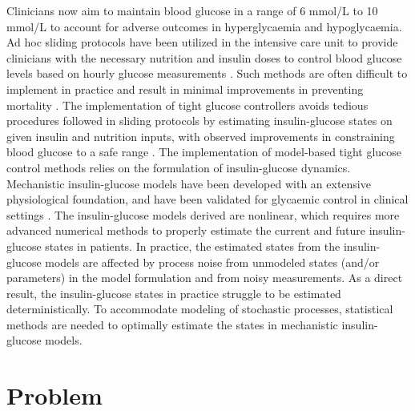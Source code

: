 \documentclass[nomenclature, english, bibtex]{kththesis}
\begin{document}
Clinicians now aim to maintain blood glucose in a range of 6 mmol/L to 10 mmol/L to account for adverse outcomes in hyperglycaemia and hypoglycaemia. Ad hoc sliding protocols have been utilized in the intensive care unit to provide clinicians with the necessary nutrition and insulin doses to control blood glucose levels based on hourly glucose measurements \cite{thomas_implementation_2005} \cite{shaw_rethinking_2006}. Such methods are often difficult to implement in practice and result in minimal improvements in preventing mortality \cite{chase_model-based_nodate}. The implementation of tight glucose controllers avoids tedious procedures followed in sliding protocols by estimating insulin-glucose states on given insulin and nutrition inputs, with observed improvements in constraining blood glucose to a safe range \cite{compte_blood_2009}. The implementation of model-based tight glucose control methods relies on the formulation of insulin-glucose dynamics. Mechanistic insulin-glucose models have been developed with an extensive physiological foundation, and have been validated for glycaemic control in clinical settings \cite{chase_model-based_nodate} \cite{compte_blood_2009} \cite{lotz_monte_2008} \cite{lin_physiological_2011} \cite{hann_integral-based_2005}. The insulin-glucose models derived are nonlinear, which requires more advanced numerical methods to properly estimate the current and future insulin-glucose states in patients. In practice, the estimated states from the insulin-glucose models are affected by process noise from unmodeled states (and/or parameters) in the model formulation and from noisy measurements. As a direct result, the insulin-glucose states in practice struggle to be estimated deterministically. To accommodate modeling of stochastic processes, statistical methods are needed to optimally estimate the states in mechanistic insulin-glucose models. 



\section{Problem}
\label{sec:problem}
\end{document}
